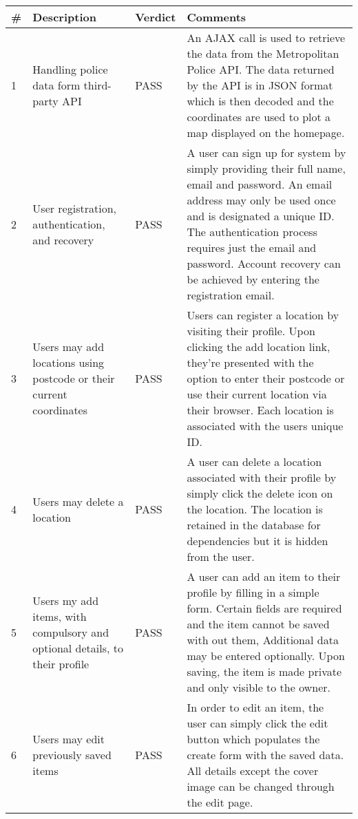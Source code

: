 \begin{longtable}{@{}p{}p{}p{}p{}@{}}
	\toprule
	\# & Description & Verdict & Comments \\ \midrule
	1 & Handling police data form third-party API & \textcolor{PassGreen}{PASS} & An AJAX call is used to retrieve the data from the Metropolitan Police API. The data returned by the API is in JSON format which is then decoded and the coordinates are used to plot a map displayed on the homepage. \\
	
	2 & User registration, authentication, and recovery & \textcolor{PassGreen}{PASS} & A user can sign up for system by simply providing their full name, email and password. An email address may only be used once and is designated a unique ID. The authentication process requires just the email and password. Account recovery can be achieved by entering the registration email.\\
	
	3 & Users may add locations using postcode or their current coordinates & \textcolor{PassGreen}{PASS} & Users can register a location by visiting their profile. Upon clicking the add location link, they're presented with the option to enter their postcode or use their current location via their browser. Each location is associated with the users unique ID. \\
	
	4 & Users may delete a location & \textcolor{PassGreen}{PASS} & A user can delete a location associated with their profile by simply click the delete icon on the location. The location is retained in the database for dependencies but it is hidden from the user. \\
	
	5 & Users my add items, with compulsory and optional details,  to their profile & \textcolor{PassGreen}{PASS} & A user can add an item to their profile by filling in a simple form. Certain fields are required and the item cannot be saved with out them, Additional data may be entered optionally. Upon saving, the item is made private and only visible to the owner. \\
	
	6 & Users may edit previously saved items & \textcolor{PassGreen}{PASS} & In order to edit an item, the user can simply click the edit button which populates the create form with the saved data. All details except the cover image can be changed through the edit page. \\
	

\end{longtable}
